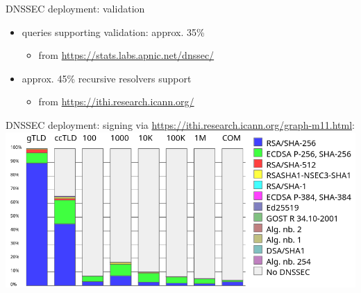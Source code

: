 

\begin{frame}{DNSSEC deployment: validation}
    \begin{itemize}
    \item queries supporting validation: approx. 35\%
        \begin{itemize}
        \item from \url{https://stats.labs.apnic.net/dnssec/}
        \end{itemize}
    \item approx. 45\% recursive resolvers support 
        \begin{itemize}
        \item from \url{https://ithi.research.icann.org/}
        \end{itemize}
    \end{itemize}
\end{frame}

\begin{frame}{DNSSEC deployment: signing}
via {\small\url{https://ithi.research.icann.org/graph-m11.html}}: \\
\includegraphics[height=0.8\textheight]{../dns/ithi-dnssec-deploy-oct-domains}
\end{frame}
